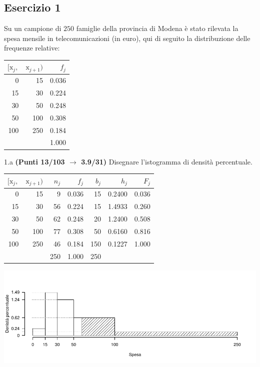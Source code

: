 \documentclass[
  11pt,
]{book}
\theoremstyle{mytheoremstyle}
\theoremstyle{mydefstyle}
\newenvironment{sol}
  {
  \begin{tcolorbox}[enhanced,breakable,arc=0.1mm,boxrule=1pt,colback=white,colframe=iblue,
  title=\bf \fontfamily{lmss}\selectfont \hspace{.5 cm} Soluzione,drop fuzzy shadow]

}{
\end{tcolorbox}
  }
\begin{document}
\subsection{Esercizio 1}\label{esercizio-1-28}

Su un campione di \(250\) famiglie della provincia di Modena è stato rilevata la spesa mensile in telecomunicazioni (in euro), qui di seguito
la distribuzione delle frequenze relative:

\begin{table}[H]
\centering
\begin{tabular}{rrr}
\toprule
$[\text{x}_j,$ & $\text{x}_{j+1})$ & $f_j$\\
\midrule
0 & 15 & 0.036\\
15 & 30 & 0.224\\
30 & 50 & 0.248\\
50 & 100 & 0.308\\
100 & 250 & 0.184\\
 &  & 1.000\\
\bottomrule
\end{tabular}
\end{table}

1.a \textbf{(Punti 13/103 \(\rightarrow\) 3.9/31)} Disegnare l'istogramma di densità percentuale.

\begin{sol}

\begin{table}[H]
\centering
\begin{tabular}{rrrrrrr}
\toprule
$[\text{x}_j,$ & $\text{x}_{j+1})$ & $n_j$ & $f_j$ & $b_j$ & $h_j$ & $F_j$\\
\midrule
0 & 15 & 9 & 0.036 & 15 & 0.2400 & 0.036\\
15 & 30 & 56 & 0.224 & 15 & 1.4933 & 0.260\\
30 & 50 & 62 & 0.248 & 20 & 1.2400 & 0.508\\
50 & 100 & 77 & 0.308 & 50 & 0.6160 & 0.816\\
100 & 250 & 46 & 0.184 & 150 & 0.1227 & 1.000\\
 &  & 250 & 1.000 & 250 &  & \\
\bottomrule
\end{tabular}
\end{table}

\begin{center}\includegraphics{Esami_passati_con_soluzioni_files/figure-latex/2023-186-1} \end{center}

\end{sol}
\end{document}
